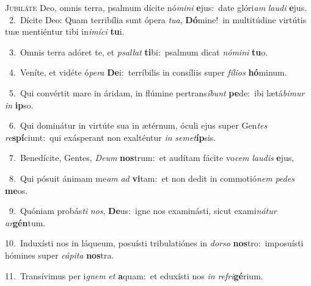 \lettrine{\initial\textcolor{\initialcolor}{J}}{ubiláte} Deo, omnis terra, psalmum dícite nó\-\textit{mi}\-\textit{ni} \textbf{e}\-jus:~\star date glóri\textit{am} \textit{lau}\-\textit{di} \textbf{e}\-jus.\\
{\numbfont\textcolor{\numbcolor}{~2.}}~Dícite Deo: Quam terribília sunt ópera \textit{tu}\-\textit{a}, \textbf{Dó}\-mine!~\star in multitúdine virtútis tuæ mentiéntur tibi in\-\textit{i}\-\textit{mí}\textit{ci} \textbf{tu}\-i.\par
{\numbfont\textcolor{\numbcolor}{~3.}}~Omnis terra adóret te, et \textit{psal}\-\textit{lat} \textbf{ti}\-bi:~\star psalmum dicat \textit{nó}\-\textit{mi}\textit{ni} \textbf{tu}\-o.\par
{\numbfont\textcolor{\numbcolor}{~4.}}~Veníte, et vidéte ó\-\textit{pe}\-\textit{ra} \textbf{De}\-i:~\star terríbilis in consíliis super \textit{fí}\-\textit{li}\textit{os} \textbf{hó}\-minum.\par
{\numbfont\textcolor{\numbcolor}{~5.}}~Qui convértit mare in áridam, in flúmine pertrans\-\textit{í}\-\textit{bunt} \textbf{pe}\-de:~\star ibi lætá\-\textit{bi}\-\textit{mur} \textit{in} \textbf{ip}\-so.\par
{\numbfont\textcolor{\numbcolor}{~6.}}~Qui dominátur in virtúte sua in ætérnum, óculi ejus super Gen\textit{tes} \textit{re}\-\textbf{spí}ciunt:~\star qui exásperant non exalténtur \textit{in} \textit{se}\-\textit{met}\textbf{íp}sis.\par
{\numbfont\textcolor{\numbcolor}{~7.}}~Benedícite, Gentes, \textit{De}\-\textit{um} \textbf{nos}\-trum:~\star et audítam fácite vo\textit{cem} \textit{lau}\-\textit{dis} \textbf{e}\-jus,\par
{\numbfont\textcolor{\numbcolor}{~8.}}~Qui pósuit ánimam me\textit{am} \textit{ad} \textbf{vi}\-tam:~\star et non dedit in commotió\textit{nem} \textit{pe}\-\textit{des} \textbf{me}\-os.\par
{\numbfont\textcolor{\numbcolor}{~9.}}~Quóniam probás\textit{ti} \textit{nos}\-, \textbf{De}\-us:~\star igne nos examinásti, sicut exami\-\textit{ná}\-\textit{tur} \textit{ar}\-\textbf{gén}tum.\par
{\numbfont\textcolor{\numbcolor}{10.}}~Induxísti nos in láqueum, posuísti tribulatiónes in \textit{dor}\-\textit{so} \textbf{nos}\-tro:~\star imposuísti hómines super \textit{cá}\-\textit{pi}\textit{ta} \textbf{nos}\-tra.\par
{\numbfont\textcolor{\numbcolor}{11.}}~Transívimus per i\textit{gnem} \textit{et} \textbf{a}\-quam:~\star et eduxísti nos \textit{in} \textit{re}\-\textit{fri}\textbf{gé}rium.\par
